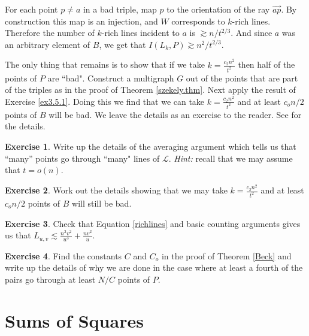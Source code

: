 \documentclass[]{amsart}
\numberwithin{equation}{section}
\theoremstyle{plain}
\theoremstyle{definition}
\newtheorem{exercise}{Exercise}[section]
\theoremstyle{remark}
\begin{document}
For each point $p \neq a$ in a bad triple, map $p$ to the
orientation of the ray $\overrightarrow{ap}$.  By construction
this map is an injection, and $W$ corresponds to $k$-rich lines.
Therefore the number of $k$-rich lines incident to $a$ is $\gtrsim
n/t^{2/3}$. And since $a$ was an arbitrary element of $B$, we get
that $I(L_k, P) \gtrsim n^2/t^{2/3}$.

The only thing that remains is to show that if we take $k=
\frac{c_2n^2}{t^2}$ then half of the points of $P$ are ``bad".
Construct a multigraph $G$ out of the points that are part of the
triples as in the proof of Theorem \ref{szekely.thm}. Next apply
the result of Exercise \ref{ex3.5.1}. Doing this we
find that we can take $k= \frac{c_2n^2}{t^2}$ and at least
$c_on/2$ points of $B$ will be bad. We leave the details as an
exercise to the reader. See \cite{Sol} for the details.



\begin{exercise} \label{ex5.1}
Write up the details of the averaging argument which tells us that
``many'' points go through ``many" lines of $\mathcal{L}$.  {\it Hint:}
recall that we may assume that $t = o(n)$. \end{exercise}

\begin{exercise} \label{ex5.2}
Work out the details showing that we may take $k=
\frac{c_2n^2}{t^2}$ and at least $c_on/2$ points of $B$ will still
be bad.\end{exercise}

\begin{exercise} \label{ex5.3}
Check that Equation \ref{richlines} and basic counting arguments
gives us that $L_{u,v} \lesssim \frac{n^2v^2}{u^3} +
\frac{nv^2}{u}$.\end{exercise}


\begin{exercise} \label{ex5.4}
Find the constants $C$ and $C_o$ in the proof of Theorem
\ref{Beck} and write up the details of why we are done in the case
where at least a fourth of the pairs go through at least $N/C$
points of $P$. \end{exercise}


\appendix

\section{Sums of Squares }
\end{document}
